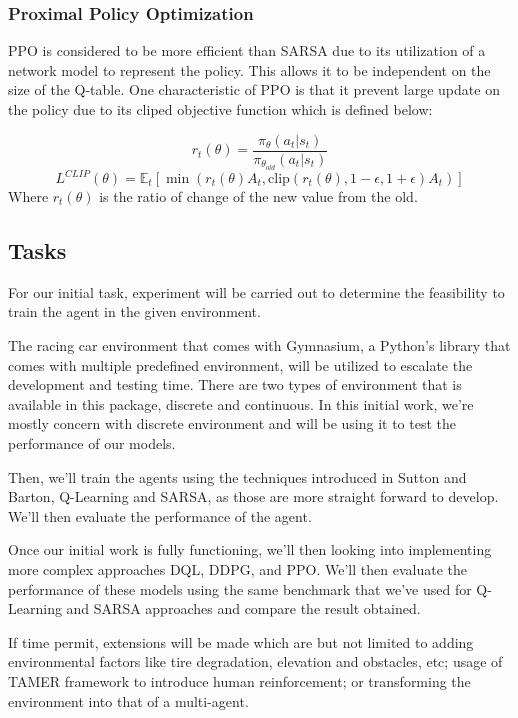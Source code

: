 \documentclass{article}
\begin{document}
\subsubsection{Proximal Policy Optimization}
PPO is considered to be more efficient than SARSA due to its utilization of a network model to represent the policy. This allows it to be independent on the size of the Q-table. 
One characteristic of PPO is that it prevent large update on the policy due to its cliped objective function\cite{huggingface_dql} which is defined below:

\[
r_t(\theta) = \frac{\pi_{\theta}(a_t|s_t)}{\pi_{\theta_{old}}(a_t|s_t)}
\]
\[
L^{CLIP}(\theta) = \mathbb{E}_{t} \left[ \min \left( 
    r_t(\theta) A_t, 
    \text{clip}(r_t(\theta), 1-\epsilon, 1+\epsilon) A_t 
\right) \right]
\]
Where $r_t(\theta)$ is the ratio of change of the new value from the old.

\subsection{Tasks}
For our initial task, experiment will be carried out to determine the feasibility to train the agent in the given environment.

The racing car environment that comes with Gymnasium, a
Python's library that comes with multiple predefined environment, will be utilized to escalate the development and testing time. There are two types of environment that is available in this package, discrete and continuous. In this initial work, we're mostly concern with discrete
environment and will be using it to test the performance of our models.

Then, we'll train the agents using the techniques introduced in Sutton and Barton, Q-Learning and SARSA, as those are more straight forward to develop. We'll then evaluate the performance of the agent.

Once our initial work is fully functioning, we'll then looking into implementing more complex approaches DQL, DDPG, and PPO. We'll then evaluate the performance of these models using the same benchmark that we've used for Q-Learning and SARSA approaches and compare the result obtained.

If time permit, extensions will be made which are but not limited to adding environmental factors like tire degradation, elevation and obstacles, etc; usage of TAMER framework to introduce human reinforcement; or transforming the environment into that of a multi-agent. 
\end{document}
